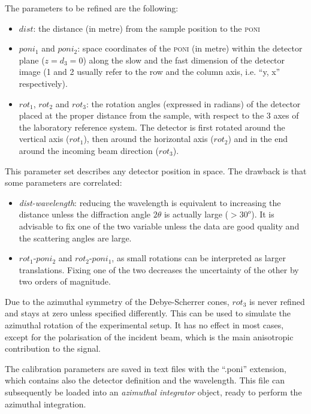 \documentclass[preprint]{iucr}              %
\begin{document}
The parameters to be refined are the following:
\begin{itemize}
  \item $dist$: the distance (in metre) from the sample position to the
  \textsc{poni}
  \item $poni_1$ and $poni_2$: space coordinates of the
  \textsc{poni} (in metre) within the detector plane ($z=d_3=0$) along the slow
  and the fast dimension of the detector image (1 and 2 usually refer to the row
  and the column axis, i.e. ``y, x'' respectively).
  \item $rot_1$, $rot_2$ and $rot_3$: the
  rotation angles (expressed in radians) of the detector placed at the proper
  distance from the sample, with respect to the 3 axes of the
  laboratory reference system.
  The detector is first rotated around the vertical axis ($rot_1$), then
  around the horizontal axis ($rot_2$) and in the end around the
  incoming beam direction ($rot_3$).
\end{itemize}

This parameter set describes any detector position in
space.
The drawback is that some parameters are correlated: 
\begin{itemize}
  \item \textit{dist-wavelength}: reducing the wavelength is equivalent to
  increasing the distance unless the diffraction angle $2\theta$ is actually
  large ($>30^o$). 
  It is advisable to fix one of the two variable unless the data are good
  quality and the scattering angles are large.
  \item $rot_1$-$poni_2$ and $rot_2$-$poni_1$, as small rotations can be
  interpreted as larger translations. 
  Fixing one of the two decreases the uncertainty of the other by two orders of
  magnitude.
\end{itemize}

Due to the azimuthal symmetry of the Debye-Scherrer cones, $rot_3$ 
is never refined and stays at zero unless specified differently.  
This can be used to simulate the azimuthal rotation of the
experimental setup. 
It has no effect in most cases, except for the
polarisation of the incident beam, which is the
main anisotropic contribution to the signal.

The calibration parameters are saved in text files with the ``.poni''
extension, which contains also the detector definition and the wavelength.
This file can subsequently be loaded into an \textit{azimuthal integrator}
object, ready to perform the azimuthal integration.
\end{document}
